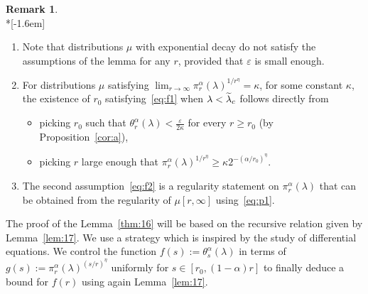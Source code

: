 \documentclass[10pt]{amsart}
\theoremstyle{definition}\newtheorem{defi}[theo]{Definition}\newtheorem{rema}[theo]{Remark}\newtheorem{exam}[theo]{Example}\newtheorem{exem}[theo]{Example}\newtheorem{nota}[theo]{Notation}
\newcommand{\ep}{\varepsilon}
\let\oldtilde\tilde
\renewcommand*{\tilde}[1]{\mathchoice{\widetilde{#1}}{\widetilde{#1}}{\oldtilde{#1}}{\oldtilde{#1}}}
\begin{document}
\begin{rema}\label{rem:22}\ \\*[-1.6em]
\begin{enumerate}
\item Note that distributions $\mu$ with exponential decay do not satisfy the assumptions of the lemma for any $r$, provided that $\ep$ is small enough. %
\item For distributions $\mu$ satisfying $\lim_{r\rightarrow\infty}\pi_r^\alpha(\lambda)^{1/r^\eta}= \kappa$, for some constant $\kappa$, the existence of $r_0$ satisfying~\eqref{eq:f1} when $\lambda<\tilde\lambda_c$ follows directly from
\begin{itemize}%
\item picking $r_0$ such that $\theta_r^\alpha(\lambda)<\tfrac{\ep}{2\kappa}$ for every $r\ge r_0$ (by Proposition~\ref{cor:a}),
\item picking $r$ large enough that $\pi_r^\alpha(\lambda)^{1/r^\eta}\ge \kappa 2^{-(\alpha/r_0)^\eta}$.
\end{itemize}
\item The second assumption~\eqref{eq:f2} is a regularity statement on $\pi_r^\alpha(\lambda)$ that can be obtained from the regularity of $\mu[r,\infty]$ using~\eqref{eq:p1}.
\end{enumerate}
\end{rema}


The proof of the Lemma~\ref{thm:16} will be based on the recursive relation given by Lemma~\ref{lem:17}. We use a strategy which is inspired by the study of differential equations. We control the function $f(s):=\theta_s^\alpha(\lambda)$ in terms of $g(s):=\pi_r^\alpha(\lambda)^{(s/r)^\eta}$ uniformly for $s\in [r_0, (1-\alpha) r]$ to finally deduce a bound for $f(r)$ using again Lemma~\ref{lem:17}.
\end{document}
